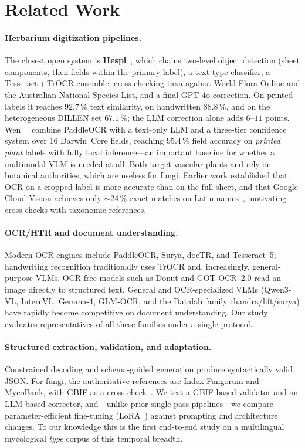 \section{Related Work}
\label{sec:related}

\paragraph{Herbarium digitization pipelines.}
The closest open system is \textbf{Hespi}~\cite{turnbull2025hespi}, which
chains two-level object detection (sheet components, then fields within the
primary label), a text-type classifier, a Tesseract\,+\,TrOCR ensemble,
cross-checking taxa against World Flora Online and the Australian National
Species List, and a final GPT-4o correction. On printed labels it reaches
$92.7\,\%$ text similarity, on handwritten $88.8\,\%$, and on the heterogeneous
DILLEN set $67.1\,\%$; the LLM correction alone adds $6$--$11$ points.
Wen~\etal~\cite{wen2025ocrllm} combine PaddleOCR with a text-only LLM and a
three-tier confidence system over 16 Darwin~Core fields, reaching $95.4\,\%$
field accuracy on \emph{printed plant} labels with fully local inference---an
important baseline for whether a multimodal VLM is needed at all. Both target
vascular plants and rely on botanical authorities, which are useless for fungi.
Earlier work established that OCR on a cropped label is more accurate than on
the full sheet, and that Google Cloud Vision achieves only $\sim$24\,\% exact
matches on Latin names~\cite{owen2020nlp}, motivating cross-checks with
taxonomic references.

\paragraph{OCR/HTR and document understanding.}
Modern OCR engines include PaddleOCR, Surya, docTR, and Tesseract~5;
handwriting recognition traditionally uses TrOCR and, increasingly,
general-purpose VLMs. OCR-free models such as Donut and GOT-OCR~2.0 read an
image directly to structured text. General and OCR-specialized VLMs
(Qwen3-VL, InternVL, Gemma-4, GLM-OCR, and the Datalab family
chandra/lift/surya) have rapidly become competitive on document understanding.
Our study evaluates representatives of all these families under a single
protocol.

\paragraph{Structured extraction, validation, and adaptation.}
Constrained decoding and schema-guided generation produce syntactically valid
JSON. For fungi, the authoritative references are Index Fungorum and MycoBank,
with GBIF as a cross-check~\cite{gbif}. We test a GBIF-based validator and an
LLM-based corrector, and---unlike prior single-pass pipelines---we compare
parameter-efficient fine-tuning (LoRA~\cite{hu2022lora}) against prompting and
architecture changes. To our knowledge this is the first end-to-end study on a
multilingual mycological \emph{type} corpus of this temporal breadth.


